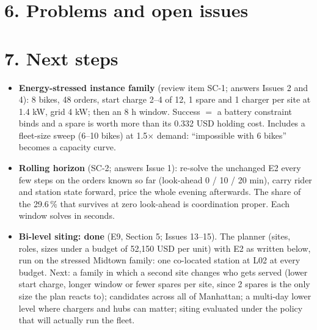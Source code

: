 \section*{6. Problems and open issues}


\section*{7. Next steps}
\begin{itemize}\setlength{\itemsep}{2pt}
  \item \textbf{Energy-stressed instance family} (review item SC-1; answers Issues 2 and 4): 8 bikes, 48 orders, start charge 2--4 of 12, 1 spare and 1 charger per site at 1.4 kW, grid 4 kW; then an 8 h window. Success $=$ a battery constraint binds and a spare is worth more than its 0.332 USD holding cost. Includes a fleet-size sweep (6--10 bikes) at 1.5$\times$ demand: ``impossible with 6 bikes'' becomes a capacity curve.
  \item \textbf{Rolling horizon} (SC-2; answers Issue 1): re-solve the unchanged E2 every few steps on the orders known so far (look-ahead 0 / 10 / 20 min), carry rider and station state forward, price the whole evening afterwards. The share of the 29.6\,\% that survives at zero look-ahead is coordination proper. Each window solves in seconds.
  \item \textbf{Bi-level siting: done} (E9, Section 5; Issues 13--15). The planner (sites, roles, sizes under a budget of 52,150 USD per unit) with E2 as written below, run on the stressed Midtown family: one co-located station at L02 at every budget. Next: a family in which a second site changes who gets served (lower start charge, longer window or fewer spares per site, since 2 spares is the only size the plan reacts to); candidates across all of Manhattan; a multi-day lower level where chargers and hubs can matter; siting evaluated under the policy that will actually run the fleet.
\end{itemize}


